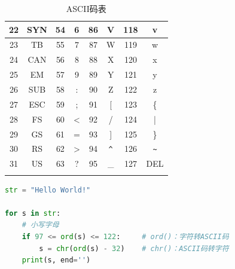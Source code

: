 \begin{longtable}{|c|c|c|c|c|c|c|c|}
    \hline
    22             & SYN           & 54             & 6             & 86             & V                      & 118            & v                      \\
    \hline
    23             & TB            & 55             & 7             & 87             & W                      & 119            & w                      \\
    \hline
    24             & CAN           & 56             & 8             & 88             & X                      & 120            & x                      \\
    \hline
    25             & EM            & 57             & 9             & 89             & Y                      & 121            & y                      \\
    \hline
    26             & SUB           & 58             & :             & 90             & Z                      & 122            & z                      \\
    \hline
    27             & ESC           & 59             & ;             & 91             & [                      & 123            & \{                     \\
            \hline
    28             & FS            & 60             & <             & 92             & /                      & 124            & |                      \\
            \hline
    29             & GS            & 61             & =             & 93             & ]                      & 125            & \}                     \\
    \hline
    30             & RS            & 62             & >             & 94             & \lstinline|^| & 126            & \lstinline|~| \\
    \hline
    31             & US            & 63             & ?             & 95             & \_                     & 127            & DEL                    \\
    \hline
    \caption{ASCII码表}
\end{longtable}

\vspace{-0.5cm}


\begin{lstlisting}[language=Python]
str = "Hello World!"

for s in str:
    # 小写字母
    if 97 <= ord(s) <= 122:     # ord()：字符转ASCII码
        s = chr(ord(s) - 32)    # chr()：ASCII码转字符
    print(s, end='')
\end{lstlisting}

